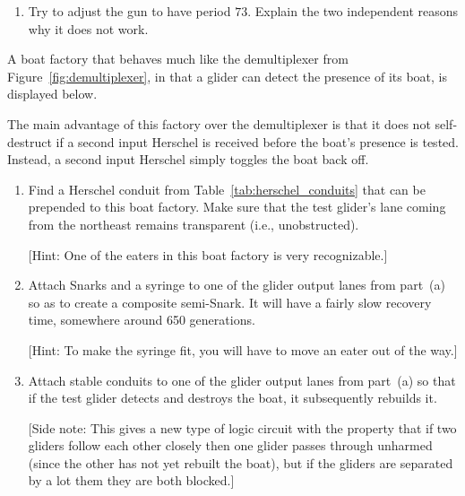 \begin{multicols}{2}
\begin{problemstar}
\begin{enumerate}[label=\bf\color{ocre}(\alph*)]
			\item Try to adjust the gun to have period $73$. Explain the two independent reasons why it does not work.
		\end{enumerate}
	\end{problemstar}


	\mfilbreak
	
	
	\begin{problem}\label{exer:toggle_better_demultiplexer}
		A boat factory that behaves much like the demultiplexer from Figure~\ref{fig:demultiplexer}, in that a glider can detect the presence of its boat, is displayed below.
		
		\begin{center}
		\end{center}
	
		\noindent The main advantage of this factory over the demultiplexer is that it does not self-destruct if a second input Herschel is received before the boat's presence is tested. Instead, a second input Herschel simply toggles the boat back off.\smallskip
	
		\begin{enumerate}[label=\bf\color{ocre}(\alph*)]
			\item {} Find a Herschel conduit from Table~\ref{tab:herschel_conduits} that can be prepended to this boat factory. Make sure that the test glider's lane coming from the northeast remains transparent (i.e., unobstructed).
			
			[Hint: One of the eaters in this boat factory is very recognizable.]
			
			\item {} Attach Snarks and a syringe to one of the glider output lanes from part~(a) so as to create a composite semi-Snark. It will have a fairly slow recovery time, somewhere around 650 generations.
			
			[Hint: To make the syringe fit, you will have to move an eater out of the way.]
			
			\item {} Attach stable conduits to one of the glider output lanes from part~(a) so that if the test glider detects and destroys the boat, it subsequently rebuilds it.
			
			[Side note: This gives a new type of logic circuit with the property that if two gliders follow each other closely then one glider passes through unharmed (since the other has not yet rebuilt the boat), but if the gliders are separated by a lot them they are both blocked.]
			

\end{enumerate}
\end{problem}
\end{multicols}
